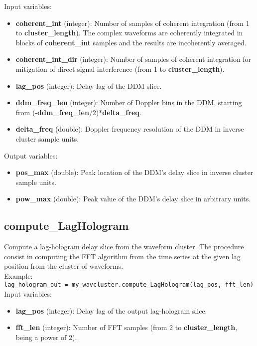 Input variables:
\begin{itemize}
\item {\bf coherent\_int} (integer): Number of samples of coherent integration (from 1 to {\bf cluster\_length}). The complex waveforms are coherently integrated in blocks of {\bf coherent\_int} samples and the results are incoherently averaged.
\item {\bf coherent\_int\_dir} (integer): Number of samples of coherent integration for mitigation of direct signal interference (from 1 to {\bf cluster\_length}).
\item {\bf lag\_pos} (integer): Delay lag of the DDM slice.
\item {\bf ddm\_freq\_len} (integer): Number of Doppler bins in the DDM, starting from (-{\bf ddm\_freq\_len}/2)*{\bf delta\_freq}.
\item {\bf delta\_freq} (double): Doppler frequency resolution of the DDM in inverse cluster sample units.
\end{itemize}

Output variables:
\begin{itemize}
\item {\bf pos\_max} (double): Peak location of the DDM's delay slice in inverse cluster sample units.
\item {\bf pow\_max} (double): Peak value of the DDM's delay slice in arbitrary units.
\end{itemize}


\subsection{compute\_LagHologram}

Compute a lag-hologram delay slice from the waveform cluster. The procedure consist in computing the FFT algorithm from the time series at the given lag position from the cluster of waveforms.\\

Example:\\

\texttt{lag\_hologram\_out = my\_wavcluster.compute\_LagHologram(lag\_pos, fft\_len)}\\

Input variables:
\begin{itemize}
\item {\bf lag\_pos} (integer): Delay lag of the output lag-hologram slice.
\item {\bf fft\_len} (integer): Number of FFT samples (from 2 to {\bf cluster\_length}, being a power of 2).
\end{itemize}

